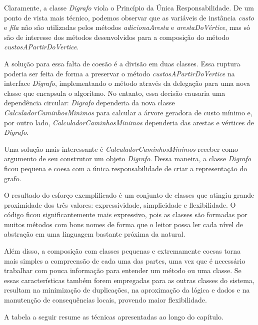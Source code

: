 Claramente, a classe \textit{Digrafo} viola o Princípio da Única Responsabilidade. De um ponto de vista mais técnico, 
podemos observar que as variáveis de instância \textit{custo} e \textit{fila} não são utilizadas pelos métodos 
\textit{adicionaAresta} e \textit{arestaDoVértice}, mas só são de interesse dos métodos desenvolvidos para a composição 
do método \textit{custosAPartirDoVertice}.

A solução para essa falta de coesão é a divisão em duas classes. Essa ruptura poderia ser feita de forma a preservar o 
método \textit{custosAPartirDoVertice} na interface \textit{Digrafo}, implementando o método através da delegação para 
uma nova classe que encapsula o algoritmo. No entanto, essa decisão causaria uma dependência circular: \textit{Digrafo} 
dependeria da nova classe \textit{CalculadorCaminhosMinimos} para calcular a árvore geradora de custo mínimo e, por outro lado,
\textit{CalculadorCaminhosMinimos} dependeria das arestas e vértices de \textit{Digrafo}.

Uma solução mais interessante é \textit{CalculadorCaminhosMinimos} receber como argumento de seu construtor um objeto \textit{Digrafo}. Dessa maneira, a classe \textit{Digrafo} ficou pequena e coesa com a única responsabilidade de criar a representação do grafo.


 
O resultado do esforço exemplificado é um conjunto de classes que atingiu grande proximidade dos três valores: 
expressividade, simplicidade e flexibilidade.
O código ficou significantemente mais expressivo, pois as classes são formadas por muitos métodos com bons nomes de forma que o leitor possa ler cada nível de abstração em uma linguagem bastante próxima da natural.
 
Além disso, a composição com classes pequenas e extremamente coesas torna mais simples a compreensão de cada uma das partes, uma vez que é necessário trabalhar com pouca informação para entender um método ou uma classe. Se essas características também forem empregadas para as outras classes do sistema, resultam na minimização de duplicações, na aproximação da lógica e dados e na manutenção de consequências locais, provendo maior flexibilidade.

A tabela a seguir resume as técnicas apresentadas ao longo do capítulo.

\newenvironment{my_itemize}
{\begin{list}{\labelitemi}
{  \setlength{\itemsep}{0pt}
  \setlength{\parskip}{0pt}
  \setlength{\parsep}{0pt}
  \setlength{\topsep}{0pt}
  \setlength{\partopsep}{0pt}
  \setlength{\leftmargin}{1em}
  \setlength{\rightmargin}{0.5em}
  \setlength{\topmargin}{0.5em}
}
}
{\end{list}}    
     

